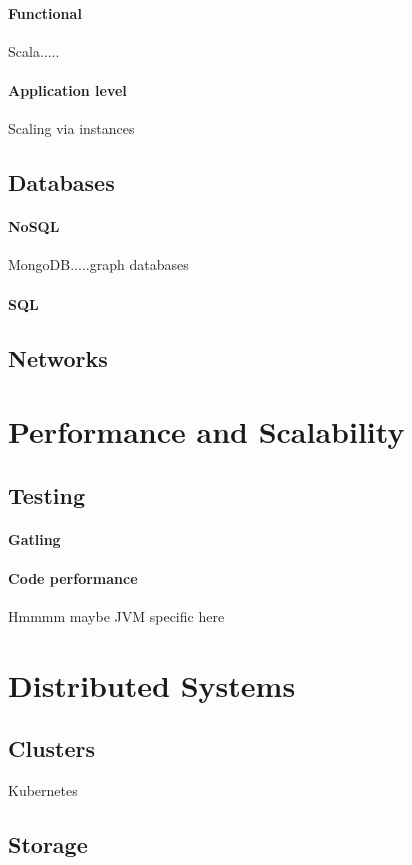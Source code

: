 \documentclass[a4paper, 11pt]{book}
\begin{document}
    \paragraph{Functional}
    Scala.....
    \paragraph{Application level}
    Scaling via instances
    \subsection{Databases}
    \paragraph{NoSQL}
    MongoDB.....graph databases
    \paragraph{SQL}
    \subsection{Networks}

    \section{Performance and Scalability}
    \lipsum[6]
    \subsection{Testing}
    \paragraph{Gatling}
    \paragraph{Code performance}
    Hmmmm maybe JVM specific here

    \section{Distributed Systems}
    \subsection{Clusters}
    Kubernetes
    \subsection{Storage}
\end{document}
